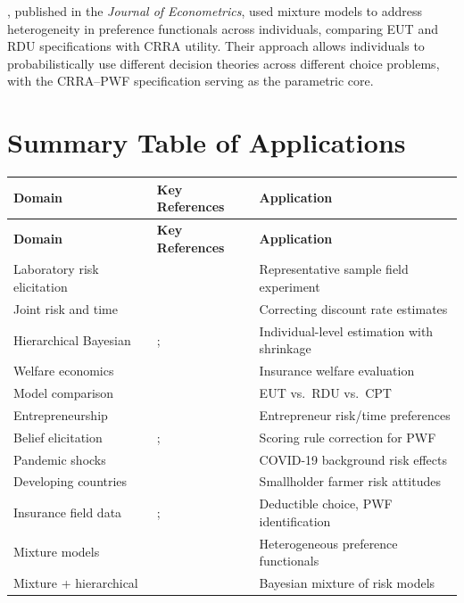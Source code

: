 \documentclass[12pt,a4paper]{article}
\begin{document}
\textcite{Conte2011}, published in the \textit{Journal of Econometrics}, used
mixture models to address heterogeneity in preference functionals across
individuals, comparing EUT and RDU specifications with CRRA utility. Their
approach allows individuals to probabilistically use different decision
theories across different choice problems, with the CRRA--PWF specification
serving as the parametric core.

\section{Summary Table of Applications}

\begin{longtable}{p{4.5cm} p{5cm} p{4.5cm}}
\toprule
\textbf{Domain} & \textbf{Key References} & \textbf{Application} \\
\midrule
\endfirsthead
\toprule
\textbf{Domain} & \textbf{Key References} & \textbf{Application} \\
\midrule
\endhead
Laboratory risk elicitation & \textcite{Harrison2007} & Representative sample field experiment \\[4pt]
Joint risk and time & \textcite{Andersen2008} & Correcting discount rate estimates \\[4pt]
Hierarchical Bayesian & \textcite{Nilsson2011}; \textcite{Gao2022} & Individual-level estimation with shrinkage \\[4pt]
Welfare economics & \textcite{Harrison2016} & Insurance welfare evaluation \\[4pt]
Model comparison & \textcite{HarrisonSwarthout2023} & EUT vs.\ RDU vs.\ CPT \\[4pt]
Entrepreneurship & \textcite{Andersen2014} & Entrepreneur risk/time preferences \\[4pt]
Belief elicitation & \textcite{Harrison2017}; \textcite{Harrison2022a} & Scoring rule correction for PWF \\[4pt]
Pandemic shocks & \textcite{Harrison2022b} & COVID-19 background risk effects \\[4pt]
Developing countries & \textcite{Tanaka2010} & Smallholder farmer risk attitudes \\[4pt]
Insurance field data & \textcite{Barseghyan2013}; \textcite{Barseghyan2018} & Deductible choice, PWF identification \\[4pt]
Mixture models & \textcite{Conte2011} & Heterogeneous preference functionals \\[4pt]
Mixture + hierarchical & \textcite{Harrison2025} & Bayesian mixture of risk models \\
\bottomrule
\end{longtable}
\end{document}
